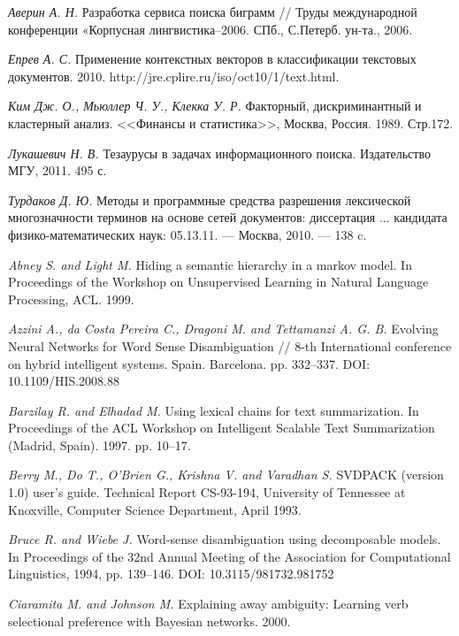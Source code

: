 \documentclass{article}
\begin{document}
\begin{articletext}
\begin{thebibliography}{9}
\textit{Аверин А. Н.} Разработка сервиса поиска биграмм // Труды международной конференции «Корпусная лингвистика–2006. СПб., С.Петерб. ун-та., 2006.

\textit{Епрев А. С.} Применение контекстных векторов в классификации текстовых документов. 2010. http://jre.cplire.ru/iso/oct10/1/text.html.

\textit{Ким Дж. О., Мьюллер Ч. У., Клекка У. Р.} Факторный, дискриминантный и кластерный анализ. <<Финансы и статистика>>, Москва, Россия. 1989. Стр.172.

\textit{Лукашевич Н. В.} Тезаурусы в задачах информационного поиска. Издательство МГУ, 2011. 495 с.

\textit{Турдаков Д. Ю.} Методы и программные средства разрешения лексической многозначности терминов на основе сетей документов: диссертация ... кандидата физико-математических наук: 05.13.11. --- Москва, 2010. --- 138 c.

\textit{Abney S. and Light M.} Hiding a semantic hierarchy in a markov model. In Proceedings of the Workshop on Unsupervised Learning in Natural Language Processing, ACL. 1999.

\textit{Azzini A., da Costa Pereira C., Dragoni M. and Tettamanzi A. G. B.} Evolving Neural Networks for Word Sense Disambiguation // 8-th International conference on hybrid intelligent systems. Spain. Barcelona. pp. 332–337. DOI: 10.1109/HIS.2008.88

\textit{Barzilay R. and  Elhadad M. }Using lexical chains for text summarization. In Proceedings of the ACL Workshop on Intelligent Scalable Text Summarization (Madrid, Spain). 1997. pp. 10–17.

\textit{Berry M.,  Do T.,  O’Brien G.,  Krishna V. and Varadhan S. }SVDPACK (version 1.0) user’s guide. Technical Report CS-93-194, University of Tennessee at Knoxville, Computer Science Department, April 1993.

\textit{Bruce R. and  Wiebe J. }Word-sense disambiguation using decomposable models. In Proceedings of the 32nd Annual Meeting of the Association for Computational Linguistics, 1994, pp. 139–146. DOI: 10.3115/981732.981752

\textit{Ciaramita M. and  Johnson M. }Explaining away ambiguity: Learning verb selectional preference with Bayesian networks. 2000. 


\end{thebibliography}
\end{articletext}
\end{document}
